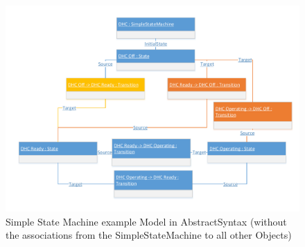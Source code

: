 \begin{figure}[htb]
	\centering
	\includegraphics[scale=0.6, trim=0cm 1cm 0cm 1cm, clip=true]{Images/ScenarioBehavioralComplexSimpleStateMachineModel1.pdf} 
	\caption{Simple State Machine example \gls{Model} in \gls{AbstractSyntax} (without the associations from the SimpleStateMachine to all other \glspl{Object})}
	\label{figScenarioBehavioralComplexSimpleStateMachineModel1}
\end{figure}



